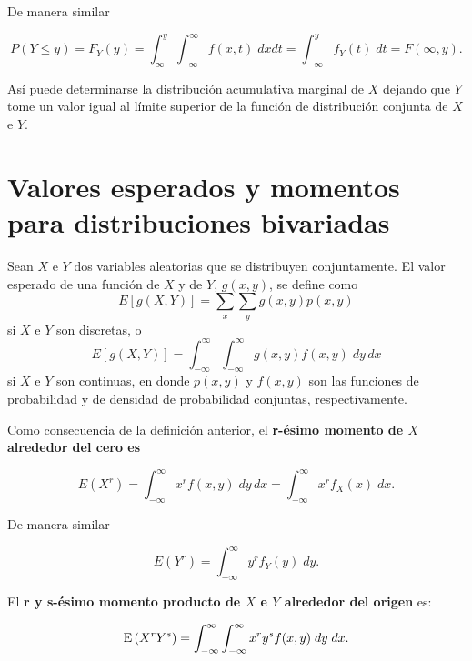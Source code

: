 De manera similar

\begin{tcolorbox}
    $$P(Y\leq y)=F_Y(y)=\int_{\infty}^y \int_{-\infty}^\infty f(x,t)\; dxdt=\int_{-\infty}^y f_Y(t)\; dt = F(\infty,y).$$
\end{tcolorbox}

Así puede determinarse la distribución acumulativa marginal de $X$ dejando que $Y$ tome un valor igual al límite superior de la función de distribución conjunta de $X$ e $Y$.

\section{Valores esperados y momentos para distribuciones bivariadas}

\begin{tcolorbox}
    \begin{def.}
	Sean $X$ e $Y$ dos variables aleatorias que se distribuyen conjuntamente. El valor esperado de una función de $X$ y de $Y$, $g(x,y)$, se define como
	$$E\left[g(X,Y)\right] = \sum_x \sum_y g(x,y) p(x,y)$$
	si $X$ e $Y$ son discretas, o
	$$E\left[g(X,Y)\right]=\int_{-\infty}^\infty \int_{-\infty}^\infty g(x,y)f(x,y)\; dy \, dx$$
	si $X$ e $Y$ son continuas, en donde $p(x,y)$ y $f(x,y)$ son las funciones de probabilidad y de densidad de probabilidad conjuntas, respectivamente.\\
    \end{def.}
\end{tcolorbox}

Como consecuencia de la definición anterior, el \textbf{\boldmath r-ésimo momento de $X$ alrededor del cero es}

\begin{tcolorbox}
    $$E\left(X^r\right)=\int_{-\infty}^\infty x^r f(x,y)\; dy\,dx = \int_{-\infty}^\infty x^r f_X(x)\; dx.$$
\end{tcolorbox}

De manera similar

\begin{tcolorbox}
    $$E\left(Y^r\right)= \int_{-\infty}^\infty y^r f_Y(y)\; dy.$$
\end{tcolorbox}

El \textbf{\boldmath r y s-ésimo momento producto de $X$ e $Y$ alrededor del origen} es:

\begin{tcolorbox}
    $$\mathrm{E}\left(X^r Y^s\right) = \int_{-\infty}^\infty \int_{-\infty}^\infty x^r y^s f(x,y)\; dy\; dx.$$
\end{tcolorbox}



